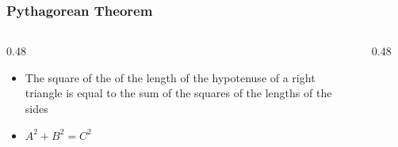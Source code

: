 
\begin{frame}
	\frametitle{Pythagorean Theorem}

    \begin{columns}
        \begin{column}{0.48\linewidth}
            \begin{itemize}[<+- | alert@+>]
                \item The square of the of the length of the hypotenuse of a right triangle is equal to the sum of the squares of the lengths of the sides
                \item $A^2+B^2=C^2$ 
            \end{itemize}
        \end{column}
        \begin{column}{0.48\linewidth}
            \begin{figure}
                \centering
                \resizebox{0.75\linewidth}{!}{
                    
                }
            \end{figure}
        \end{column}
    \end{columns}
\end{frame}

